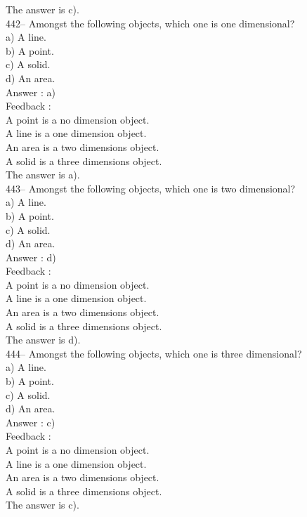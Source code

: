 \documentclass[letterpaper, 12pt]{article}
\begin{document}
The answer is c).\\


442-- Amongst the following objects, which one is one dimensional?\\
a) A line.\\
b) A point.\\
c) A solid.\\
d) An area.\\


Answer : a)\\

Feedback : \\

A point is a no dimension object.\\
A line is a one dimension object.\\
An area is a two dimensions object.\\
A solid is a three dimensions object.\\
The answer is a).\\

443-- Amongst the following objects, which one is two dimensional?\\
a) A line.\\
b) A point.\\
c) A solid.\\
d) An area.\\

Answer : d)\\

Feedback : \\
A point is a no dimension object.\\
A line is a one dimension object.\\
An area is a two dimensions object.\\
A solid is a three dimensions object.\\
The answer is d).\\

444-- Amongst the following objects, which one is three dimensional?\\
a) A line.\\
b) A point.\\
c) A solid.\\
d) An area.\\

Answer : c)\\

Feedback : \\
A point is a no dimension object.\\
A line is a one dimension object.\\
An area is a two dimensions object.\\
A solid is a three dimensions object.\\
The answer is c).\\
\end{document}
